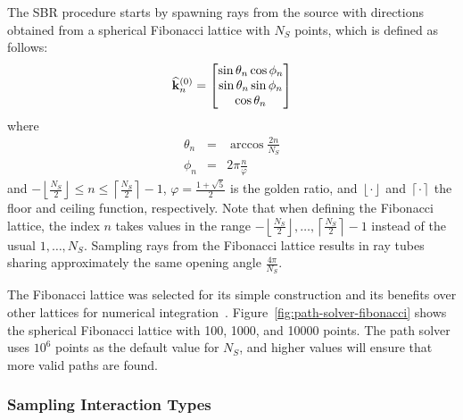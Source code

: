 The \gls{SBR} procedure starts by spawning rays from the source with directions obtained from a spherical Fibonacci lattice with $N_S$ points, which is defined as follows:
\begin{equation}
    \widehat{\mathbf{k}}_n^{(0)} =
    \begin{bmatrix}
        \sin{\theta_n}\cos{\phi_n}\\
        \sin{\theta_n}\sin{\phi_n}\\
        \cos{\theta_n}
    \end{bmatrix}
\end{equation}
where
\begin{eqnarray*}
    \theta_n &= & \arccos{\frac{2n}{N_S}}\\
    \phi_n &= & 2\pi\frac{n}{\varphi}
\end{eqnarray*}
and $-\left\lfloor\frac{N_S}{2}\right\rfloor \leq n \leq \left\lceil \frac{N_S}{2} \right\rceil - 1$, $\varphi = \frac{1 + \sqrt{5}}{2}$ is the golden ratio, and $\left\lfloor \cdot \right\rfloor$ and $\left\lceil \cdot \right\rceil$ the floor and ceiling function, respectively.
Note that when defining the Fibonacci lattice, the index $n$ takes values in the range $-\left\lfloor\frac{N_S}{2}\right\rfloor, \dots, \left\lceil \frac{N_S}{2} \right\rceil - 1$ instead of the usual $1,\dots,N_S$.
Sampling rays from the Fibonacci lattice results in ray tubes sharing approximately the same opening angle $\frac{4\pi}{N_S}$.

The Fibonacci lattice was selected for its simple construction and its benefits over other lattices for numerical integration~\cite{gonzalez2010measurement,hannay2004fibonacci}.
Figure~\ref{fig:path-solver-fibonacci} shows the spherical Fibonacci lattice with 100, 1000, and 10000 points.
The \SRT{} path solver uses $10^6$ points as the default value for $N_S$, and higher values will ensure that more valid paths are found.

\subsubsection{Sampling Interaction Types}
\label{sec:path-solver-interaction-sampling}

